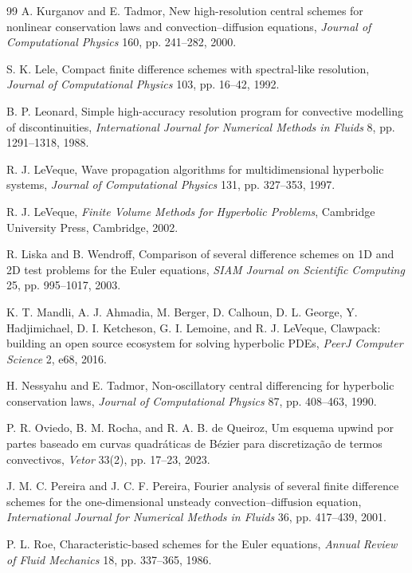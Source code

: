 \documentclass[11pt]{article}
\theoremstyle{plain}
\theoremstyle{definition}
\begin{document}
\begin{thebibliography}{99}
 A. Kurganov and E. Tadmor, New high-resolution central schemes for nonlinear conservation laws and convection--diffusion equations, \textit{Journal of Computational Physics} 160, pp. 241--282, 2000.

 S. K. Lele, Compact finite difference schemes with spectral-like resolution, \textit{Journal of Computational Physics} 103, pp. 16--42, 1992.

 B. P. Leonard, Simple high-accuracy resolution program for convective modelling of discontinuities, \textit{International Journal for Numerical Methods in Fluids} 8, pp. 1291--1318, 1988.

 R. J. LeVeque, Wave propagation algorithms for multidimensional hyperbolic systems, \textit{Journal of Computational Physics} 131, pp. 327--353, 1997.

 R. J. LeVeque, \textit{Finite Volume Methods for Hyperbolic Problems}, Cambridge University Press, Cambridge, 2002.

 R. Liska and B. Wendroff, Comparison of several difference schemes on 1D and 2D test problems for the Euler equations, \textit{SIAM Journal on Scientific Computing} 25, pp. 995--1017, 2003.

 K. T. Mandli, A. J. Ahmadia, M. Berger, D. Calhoun, D. L. George, Y. Hadjimichael, D. I. Ketcheson, G. I. Lemoine, and R. J. LeVeque, Clawpack: building an open source ecosystem for solving hyperbolic PDEs, \textit{PeerJ Computer Science} 2, e68, 2016.

 H. Nessyahu and E. Tadmor, Non-oscillatory central differencing for hyperbolic conservation laws, \textit{Journal of Computational Physics} 87, pp. 408--463, 1990.

 P. R. Oviedo, B. M. Rocha, and R. A. B. de Queiroz, Um esquema upwind por partes baseado em curvas quadr\'aticas de B\'ezier para discretiza\c{c}\~ao de termos convectivos, \textit{Vetor} 33(2), pp. 17--23, 2023.

 J. M. C. Pereira and J. C. F. Pereira, Fourier analysis of several finite difference schemes for the one-dimensional unsteady convection--diffusion equation, \textit{International Journal for Numerical Methods in Fluids} 36, pp. 417--439, 2001.

 P. L. Roe, Characteristic-based schemes for the Euler equations, \textit{Annual Review of Fluid Mechanics} 18, pp. 337--365, 1986.


\end{thebibliography}
\end{document}
